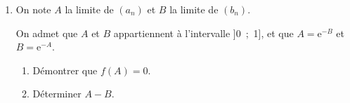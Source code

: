 \begin{enumerate}
\begin{enumerate}
		\item En déduire que les suites $\left(a_n\right)$ et $\left(b_n\right)$ sont convergentes.
	\end{enumerate}	
\item On note $A$ la limite de $\left(a_n\right)$ et $B$ la limite de $\left(b_n\right)$.

On admet que $A$ et $B$ appartiennent à l'intervalle ]0~;~1], et que $A = \text{e}^{-B}$ et $B = \text{e}^{-A}$.
	\begin{enumerate}
		\item Démontrer que $f(A) = 0$.
		\item Déterminer $A - B$.
	\end{enumerate}
\end{enumerate}
